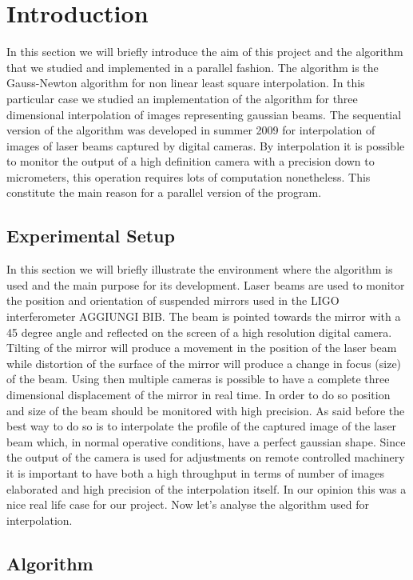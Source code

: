 \section{Introduction}  

In this section we will briefly introduce the aim of this project and the algorithm that we studied and implemented in a parallel fashion.
The algorithm is the Gauss-Newton algorithm for non linear least square interpolation.
In this particular case we studied an implementation of the algorithm for three dimensional interpolation of images representing gaussian beams.
The sequential version of the algorithm was developed in summer 2009 for interpolation of images of laser beams captured by digital cameras. 
By interpolation it is possible to monitor the output of a high definition camera with a precision down to micrometers, this operation requires lots of computation nonetheless.
This constitute the main reason for a parallel version of the program.

\subsection{Experimental Setup}

In this section we will briefly illustrate the environment where the algorithm is used and the main purpose for its development.
Laser beams are used to monitor the position and orientation of suspended mirrors used in the LIGO interferometer AGGIUNGI BIB. 
The beam is pointed towards the mirror with a 45 degree angle and reflected on the screen of a high resolution digital camera.
Tilting of the mirror will produce a movement in the position of the laser beam while distortion of the surface of the mirror will produce a change in focus (size) of the beam.
Using then multiple cameras is possible to have a complete three dimensional displacement of the mirror in real time.
In order to do so position and size of the beam should be monitored with high precision. 
As said before the best way to do so is to interpolate the profile of the captured image of the laser beam which, in normal operative conditions, have a perfect gaussian shape.
Since the output of the camera is used for adjustments on remote controlled machinery it is important to have both a high throughput in terms of number of images elaborated and high precision of the interpolation itself.
In our opinion this was a nice real life case for our project.
Now let's analyse the algorithm used for interpolation.

\subsection{Algorithm}

